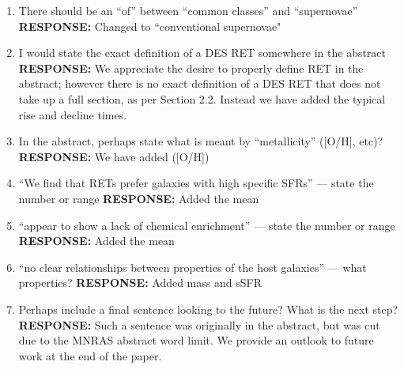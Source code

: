 \documentclass{article}
\begin{document}
\begin{enumerate}
\item There should be an “of” between “common classes” and “supernovae”
\vskip0.1cm
{\bf RESPONSE: } Changed to ``conventional supernovae"

\item I would state the exact definition of a DES RET somewhere in the abstract
\vskip0.1cm
{\bf RESPONSE: } We appreciate the desire to properly define RET in the abstract; however there is no exact definition of a DES RET that does not take up a full section, as per Section 2.2. Instead we have added the typical rise and decline times.

\item In the abstract, perhaps state what is meant by “metallicity” ([O/H], etc)?
\vskip0.1cm
{\bf RESPONSE: } We have added ([O/H])

\item “We find that RETs prefer galaxies with high specific SFRs” — state the number or range
\vskip0.1cm
{\bf RESPONSE: } Added the mean

\item “appear to show a lack of chemical enrichment” — state the number or range
\vskip0.1cm
{\bf RESPONSE: } Added the mean

\item “no clear relationships between properties of the host galaxies” — what properties?
\vskip0.1cm
{\bf RESPONSE: } Added mass and sSFR 

\item Perhaps include a final sentence looking to the future? What is the next step?
\vskip0.1cm
{\bf RESPONSE: } Such a sentence was originally in the abstract, but was cut due to the MNRAS abstract word limit. We provide an outlook to future work at the end of the paper.
\end{enumerate}
\end{document}
